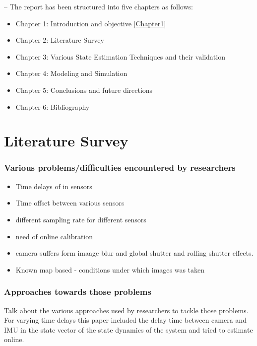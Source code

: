  -- The report has been structured into  five chapters as follows:
\begin{itemize}
\item Chapter 1: Introduction and objective \ref{Chapter1}
\item Chapter 2: Literature Survey
\item Chapter 3: Various State Estimation Techniques and their validation
\item Chapter 4: Modeling and Simulation
\item Chapter 5: Conclusions and future directions
\item Chapter 6: Bibliography
\end{itemize}

\chapter{Literature Survey}
\label{chapter 2}

\subsection{Various problems/difficulties encountered by researchers}

\begin{itemize}
    \item Time delays of in sensors
    \item Time offset between various sensors
    \item different sampling rate for different sensors
    \item need of online calibration
    \item camera suffers form imaage blur and global shutter and rolling shutter effects.
    \item Known map based - conditions under which images was taken 
    
\end{itemize}

\subsection{Approaches towards those problems}
Talk about the various approaches used by researchers to tackle those problems. For varying time delays this paper included the delay time between camera and IMU in the state vector of the state dynamics of the system and tried to estimate online.
